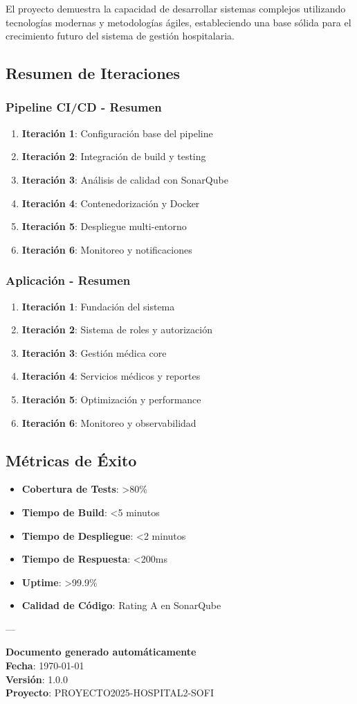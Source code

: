 \documentclass[12pt,a4paper]{article}
\begin{document}
El proyecto demuestra la capacidad de desarrollar sistemas complejos utilizando tecnologías modernas y metodologías ágiles, estableciendo una base sólida para el crecimiento futuro del sistema de gestión hospitalaria.

\subsection{Resumen de Iteraciones}

\subsubsection{Pipeline CI/CD - Resumen}
\begin{enumerate}
    \item \textbf{Iteración 1}: Configuración base del pipeline
    \item \textbf{Iteración 2}: Integración de build y testing
    \item \textbf{Iteración 3}: Análisis de calidad con SonarQube
    \item \textbf{Iteración 4}: Contenedorización y Docker
    \item \textbf{Iteración 5}: Despliegue multi-entorno
    \item \textbf{Iteración 6}: Monitoreo y notificaciones
\end{enumerate}

\subsubsection{Aplicación - Resumen}
\begin{enumerate}
    \item \textbf{Iteración 1}: Fundación del sistema
    \item \textbf{Iteración 2}: Sistema de roles y autorización
    \item \textbf{Iteración 3}: Gestión médica core
    \item \textbf{Iteración 4}: Servicios médicos y reportes
    \item \textbf{Iteración 5}: Optimización y performance
    \item \textbf{Iteración 6}: Monitoreo y observabilidad
\end{enumerate}

\subsection{Métricas de Éxito}
\begin{itemize}
    \item \textbf{Cobertura de Tests}: >80\%
    \item \textbf{Tiempo de Build}: <5 minutos
    \item \textbf{Tiempo de Despliegue}: <2 minutos
    \item \textbf{Tiempo de Respuesta}: <200ms
    \item \textbf{Uptime}: >99.9\%
    \item \textbf{Calidad de Código}: Rating A en SonarQube
\end{itemize}

---

\textbf{Documento generado automáticamente} \\
\textbf{Fecha}: \today \\
\textbf{Versión}: 1.0.0 \\
\textbf{Proyecto}: PROYECTO2025-HOSPITAL2-SOFI
\end{document}
